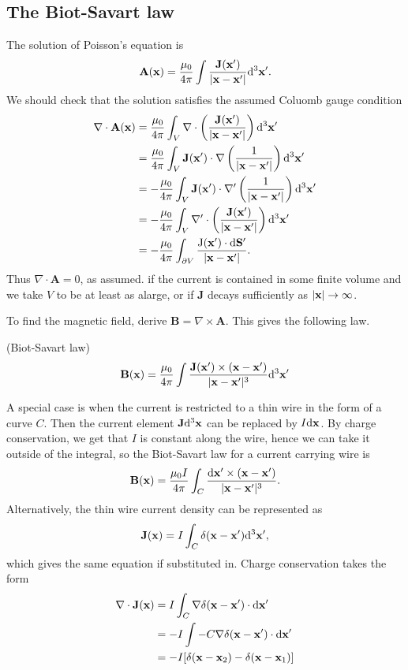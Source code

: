 \documentclass{article}
\begin{document}
\subsection{The Biot-Savart law}
The solution of Poisson's equation is
\[
	\mathbf A(\mathbf{x}) = \frac{\mu_0}{4\pi} \int\frac{\mathbf J(\mathbf{x}')}{|\mathbf{x} - \mathbf{x}'|} \mathrm d^3 \mathbf{x}'.
\]
We should check that the solution satisfies the assumed Coluomb gauge condition
\begin{align*}
	\nabla\cdot\mathbf A(\mathbf{x})&=\frac{\mu_0}{4\pi}\int_V\nabla\cdot\left(\frac{\mathbf J(\mathbf{x}')}{|\mathbf{x}-\mathbf{x}'|}\right)\mathrm d^3\mathbf{x}'\\
				&=\frac{\mu_0}{4\pi}\int_V\mathbf J(\mathbf{x}')\cdot\nabla\left(\frac 1{|\mathbf{x}-\mathbf{x}'|}\right)\mathrm d^3\mathbf{x}'\\
				&=-\frac{\mu_0}{4\pi}\int_V\mathbf J(\mathbf{x}')\cdot\nabla'\left(\frac 1{|\mathbf{x}-\mathbf{x}'|}\right)\mathrm d^3\mathbf{x}'\\
				&=-\frac{\mu_0}{4\pi}\int_V\nabla'\cdot\left(\frac {\mathbf J(\mathbf{x}')}{|\mathbf{x}-\mathbf{x}'|}\right)\mathrm d^3\mathbf{x}'\\
				&=-\frac{\mu_0}{4\pi}\int_{\partial V}\frac{\mathrm J(\mathbf{x}')\cdot\mathrm d\mathbf S'}{|\mathbf{x}-\mathbf{x}'|}.
\end{align*}
Thus $ \nabla\cdot\mathbf A=0 $, as assumed. if the current is contained in some finite volume and we take $ V $ to be at least as alarge, or if $ \mathbf J $ decays sufficiently as $ |\mathbf{x}|\to \infty $.\par
To find the magnetic field, derive $ \mathbf B = \nabla\times \mathbf A $. This gives the following law.
\begin{theorem}
	(Biot-Savart law)
\begin{align*}
	\mathbf B(\mathbf{x})=\frac{\mu_0}{4\pi}\int\frac{\mathbf J(\mathbf{x}')\times (\mathbf{x}-\mathbf{x}')}{|\mathbf{x}-\mathbf{x}'|^3}\mathrm d^3\mathbf{x}'
\end{align*}
\end{theorem}
A special case is when the current is restricted to a thin wire in the form of a curve $ C $. Then the current element $ \mathbf J \mathrm d^3 \mathbf{x} $ can be replaced by $ I\mathrm d\mathbf{x} $. By charge conservation, we get that $ I $ is constant along the wire, hence we can take it outside of the integral, so the Biot-Savart law for a current carrying wire is
\[
	\mathbf B(\mathbf{x}) = \frac{\mu_0 I}{4\pi} \int_C\frac{\mathrm d\mathbf{x}'\times (\mathbf{x}-\mathbf{x}')}{|\mathbf{x}-\mathbf{x}'|^3}.
\]
Alternatively, the thin wire current density can be represented as
\[
  \mathbf J(\mathbf{x}) = I\int_C\delta(\mathbf{x}-\mathbf{x}')\mathrm d^3\mathbf{x}',
\]
which gives the same equation if substituted in. Charge conservation takes the form
\begin{align*}
	\nabla\cdot\mathbf J(\mathbf{x}) &= I\int_C \nabla\delta(\mathbf{x}-\mathbf{x}')\cdot\mathrm d\mathbf{x}'\\
				 &= -I\int-C\nabla \delta(\mathbf{x}-\mathbf{x}')\cdot\mathrm d\mathbf{x}'\\
				 &= -I[\delta(\mathbf{x}-\mathbf{x}_2)-\delta(\mathbf{x}-\mathbf{x}_1)]
\end{align*}
\end{document}
